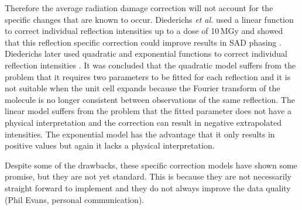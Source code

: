 		Therefore the average radiation damage correction will not account for the specific changes that are known to occur.
		Diederichs \textit{et al.} used a linear function to correct individual reflection intensities up to a dose of 10\,MGy and showed that this reflection specific correction could improve results in SAD phasing \cite{diederichs2003}.
		Diederichs later used quadratic and exponential functions to correct individual reflection intensities \cite{diederichs2006}.
		It was concluded that the quadratic model suffers from the problem that it requires two parameters to be fitted for each reflection and it is not suitable when the unit cell expands because the Fourier transform of the molecule is no longer consistent between observations of the same reflection.
		The linear model suffers from the problem that the fitted parameter does not have a physical interpretation and the correction can result in negative extrapolated intensities.
		The exponential model has the advantage that it only results in positive values but again it lacks a physical interpretation.

		Despite some of the drawbacks, these specific correction models have shown some promise, but they are not yet standard.
        This is because they are not necessarily straight forward to implement and they do not always improve the data quality (Phil Evans, personal communication).
